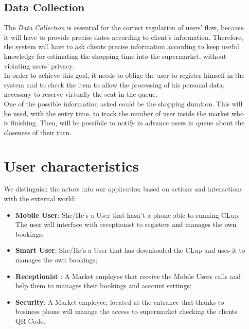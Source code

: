 \subsection{Data Collection}
The \textit{Data Collection} is essential for the correct regulation of users' flow, because it will have to provide precise dates according to client’s information. 
Therefore, the system will have to ask clients precise information according to keep useful knowledge for estimating the shopping time into the supermarket, without violating users’ privacy. 
\\
In order to achieve this goal, it needs to oblige the user to register himself in the system and to check the item to allow the processing of his personal data, necessary to reserve virtually the seat in the queue.
\\
One of the possible information asked could be the shopping duration. This will be used, with the entry time, to track the number of user inside the market who is finishing. Then, will be possibile to notify in advance users in queue about the closeness of their turn.

\section{User characteristics}
We distinguish the actors into our application based on actions and interactions with the external world:

\begin{itemize}
\item\textbf{Mobile User}: She/He's a User that hasn't a phone able to running CLup. The user will interface with receptionist to registers and manages the own bookings;
\item\textbf{Smart User}: She/He's a User that has downloaded the CLup and uses it to manages the own bookings;
\item\textbf{Receptionist} : A Market employee that receive the Mobile Users calls and help them to manages their bookings and account settings;
\item\textbf{Security}: A Market employee, located at the entrance that thanks to business phone will manage the access to supermarket checking the clients QR Code.
\end{itemize}

